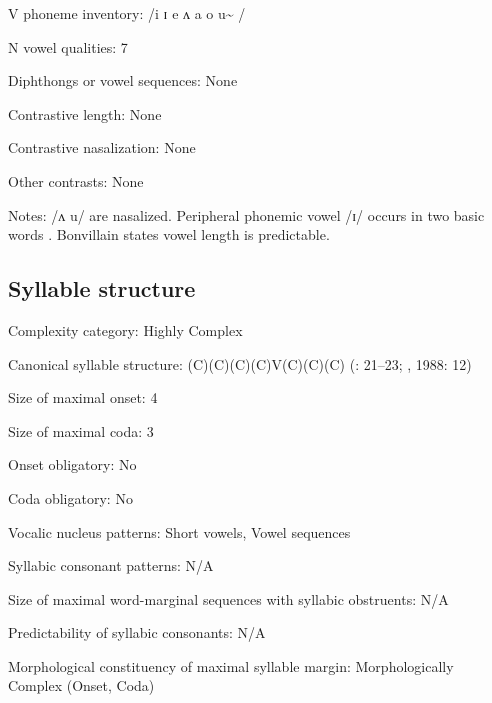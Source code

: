 {\begin{appendixdesc}
\item[V phoneme inventory:] /i ɪ e ʌ a o u\~{} /

\item[N vowel qualities:] 7

\item[Diphthongs or vowel sequences:] None

\item[Contrastive length:] None

\item[Contrastive nasalization:] None

\item[Other contrasts:] None

\item[Notes:] /ʌ u/ are nasalized. Peripheral phonemic vowel /ɪ/ occurs in two basic words \citep[43]{Bonvillain1973}. Bonvillain states vowel length is predictable.
\end{appendixdesc}
\subsection*{Syllable structure}
\begin{appendixdesc}

\item[Complexity category:] Highly Complex

\item[Canonical syllable structure:] (C)(C)(C)(C)V(C)(C)(C) (\citealt{Bonvillain1973}: 21--23; \citealt{Michelson1981}, 1988: 12)

\item[Size of maximal onset:] 4

\item[Size of maximal coda:] 3

\item[Onset obligatory:] No

\item[Coda obligatory:] No

\item[Vocalic nucleus patterns:] Short vowels, Vowel sequences

\item[Syllabic consonant patterns:] N/A

\item[Size of maximal word-marginal sequences with syllabic obstruents:] N/A

\item[Predictability of syllabic consonants:] N/A

\item[Morphological constituency of maximal syllable margin:] Morphologically Complex (Onset, Coda)


\end{appendixdesc}}
